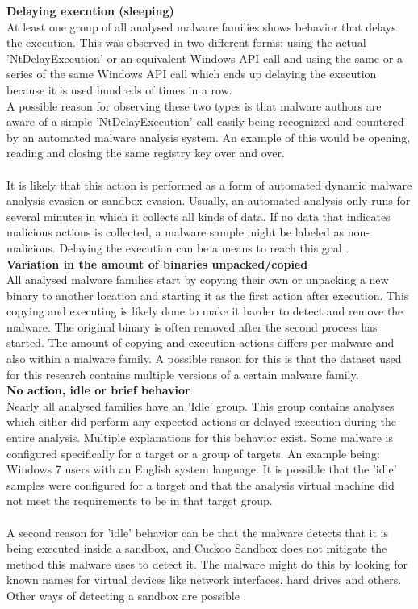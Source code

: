 \documentclass[conference]{IEEEtran}
\begin{document}
\textbf{Delaying execution (\Gls{sleeping})}\\
At least one group of all analysed malware families shows behavior that delays the execution. This was observed in two different forms: using the actual 'NtDelayExecution' or an equivalent Windows API call and using the same or a series of the same Windows API call which ends up delaying the execution because it is used hundreds of times in a row. \\A possible reason for observing these two types is that malware authors are aware of a simple 'NtDelayExecution' call easily being recognized and countered by an automated malware analysis system. An example of this would be opening, reading and closing the same registry key over and over. \\\\It is likely that this action is performed as a form of automated dynamic malware analysis evasion or sandbox evasion. Usually, an automated analysis only runs for several minutes in which it collects all kinds of data. If no data that indicates \Gls{malicious actions} is collected, a malware sample might be labeled as non-malicious. Delaying the execution can be a means to reach this goal \cite{keragala-evasion}.\\

\textbf{Variation in the amount of binaries unpacked/copied}\\
All analysed malware families start by copying their own or unpacking a new binary to another location and starting it as the first action after execution. This copying and executing is likely done to make it harder to detect and remove the malware. The original binary is often removed after the second process has started. The amount of copying and execution actions differs per malware and also within a malware family. A possible reason for this is that the dataset used for this research contains multiple versions of a certain malware family.\\

\textbf{No action, idle or brief behavior}\\
Nearly all analysed families have an 'Idle' group. This group contains analyses which either did perform any expected actions or delayed execution during the entire analysis. Multiple explanations for this behavior exist. Some malware is configured specifically for a target or a group of targets. An example being: Windows 7 users with an English system language. It is possible that the 'idle' samples were configured for a target and that the analysis virtual machine did not meet the requirements to be in that target group.\\\\
A second reason for 'idle' behavior can be that the malware detects that it is being executed inside a sandbox, and Cuckoo Sandbox does not mitigate the method this malware uses to detect it. The malware might do this by looking for known names for virtual devices like network interfaces, hard drives and others. Other ways of detecting a sandbox are possible \cite{keragala-evasion}.\\
\end{document}
